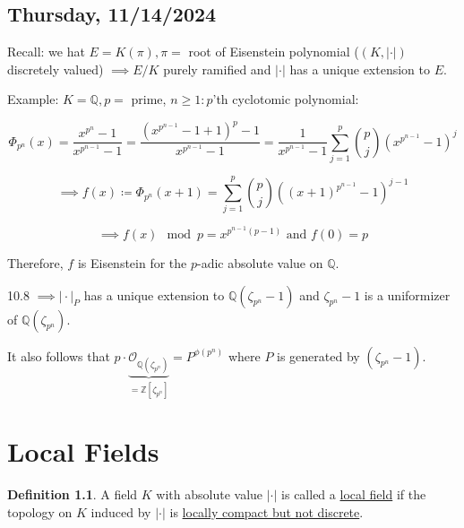 \documentclass[openany]{amsbook}
\numberwithin{section}{chapter}
\theoremstyle{definition}
\newtheorem*{definition}{Definition}
\begin{document}
\section*{Thursday, 11/14/2024}

Recall: we hat \(E=K(\pi), \pi =\) root of Eisenstein polynomial (\((K,\vert \cdot \vert)\) discretely valued) \(\implies E / K\) purely ramified and \(\vert \cdot \vert\) has a unique extension to \(E\).

Example: \(K = \mathbb{Q}, p=\) prime, \(n \geq 1: p\)'th cyclotomic polynomial:

\[
    \Phi_{p^n}(x) = \frac{x^{p^n}-1}{x^{p^{n-1}}-1} = \frac{(x^{p^{n-1}}-1+1)^p - 1}{x^{p^{n-1}}-1} = \frac{1}{x^{p^{n-1}}-1} \sum_{j=1}^p \binom{p}{j}(x^{p^{n-1}}-1)^j
\]

\[
    \implies f(x) \coloneqq \Phi_{p^n}(x+1) = \sum_{j=1}^p \binom{p}{j}((x+1)^{p^{n-1}}-1)^{j-1}
\]

\[
    \implies f(x) \mod p = x^{p^{n-1}(p-1)} \text{ and } f(0)=p
\]

Therefore, \(f\) is Eisenstein for the \(p\)-adic absolute value on \(\mathbb{Q}\).

10.8 \(\implies \vert \cdot \vert_P\) has a unique extension to \(\mathbb{Q}(\zeta_{p^n} - 1)\) and \(\zeta_{p^n}-1\) is a uniformizer of \(\mathbb{Q}(\zeta_{p^n})\).

It also follows that \(p\cdot \underbrace{\mathcal{O}_{\mathbb{Q}(\zeta_{p^n})}}_{=\mathbb{Z}[\zeta_{p^n}]} = P^{\phi(p^n)}\) where \(P\) is generated by \((\zeta_{p^n}-1)\).

\chapter{Local Fields}

\begin{definition}
    A field \(K\) with absolute value \(\vert \cdot \vert\) is called a \underline{local field} if the topology on \(K\) induced by \(\vert \cdot \vert\) is \underline{locally compact but not discrete}.
\end{definition}
\end{document}
